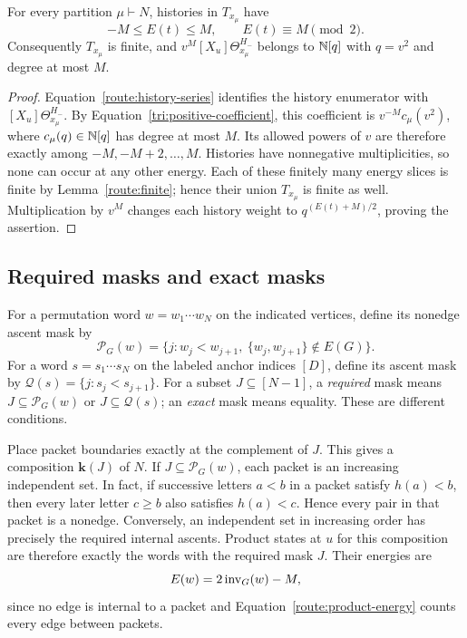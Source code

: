 \begin{proposition}
\label{route:parity}
For every partition $\mu\vdash N$, histories in $T_{x_\mu}$ have
\begin{equation}
 \label{route:parity-range}
 -M\leq E(t)\leq M,\qquad E(t)\equiv M\pmod 2.
\end{equation}
Consequently $T_{x_\mu}$ is finite, and
$v^M[X_u]\Theta_{x_\mu}^{H_-}$ belongs to $\mathbb N[q]$ with $q=v^2$
and degree at most $M$.
\end{proposition}

\begin{proof}
Equation~\eqref{route:history-series} identifies the history enumerator
with $[X_u]\Theta_{x_\mu}^{H_-}$. By
Equation~\eqref{tri:positive-coefficient}, this coefficient is
$v^{-M}c_\mu(v^2)$, where $c_\mu(q)\in\mathbb N[q]$ has degree at most $M$.
Its allowed powers of $v$ are therefore exactly among
$-M,-M+2,\ldots,M$. Histories have nonnegative multiplicities, so
none can occur at any other energy. Each of these finitely many
energy slices is finite by Lemma~\ref{route:finite}; hence their
union $T_{x_\mu}$ is finite as well. Multiplication by $v^M$ changes
each history weight to $q^{(E(t)+M)/2}$, proving the assertion.
\end{proof}

\subsection{Required masks and exact masks}
\label{route:masks}

For a permutation word $w=w_1\cdots w_N$ on the indicated vertices,
define its nonedge ascent mask by
\[
 \mathcal P_G(w)=
 \{j: w_j<w_{j+1},\ \{w_j,w_{j+1}\}\notin E(G)\}.
\]
For a word $s=s_1\cdots s_N$ on the labeled anchor indices
$[D]$, define its ascent mask by
$\mathcal Q(s)=\{j:s_j<s_{j+1}\}$.
For a subset $J\subseteq[N-1]$, a \emph{required} mask means
$J\subseteq\mathcal P_G(w)$ or $J\subseteq\mathcal Q(s)$;
an \emph{exact} mask means equality.  These are different conditions.

Place packet boundaries exactly at the complement of $J$.  This
gives a composition ${\boldsymbol k}(J)$ of $N$.  If
$J\subseteq\mathcal P_G(w)$, each packet is an increasing independent
set.  In fact, if successive letters $a<b$ in a packet satisfy
$h(a)<b$, then every later letter $c\geq b$ also satisfies
$h(a)<c$.  Hence every pair in that packet is a nonedge.
Conversely, an independent set in increasing order has precisely
the required internal ascents.  Product states at $u$ for this
composition are therefore exactly the words with the required
mask $J$.  Their energies are
\begin{equation}
 \label{route:word-energy}
 E(w)=2\operatorname{inv}_G(w)-M,
\end{equation}
since no edge is internal to a packet and
Equation~\eqref{route:product-energy} counts every edge between packets.

